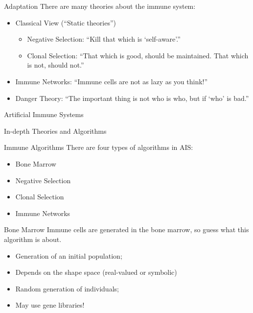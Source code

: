 \documentclass[xcolor=svgnames]{beamer}
\newcommand{\introframe}[2]{
    \begin{frame}
	   \vfill
	   \hfill\Huge{#1}
	   
	   \vspace{1em}
	   
	   \hfill\Large{#2}
	   \vfill
    \end{frame}
}
\begin{document}
		\begin{frame}{Adaptation}
		    There are many theories about the immune system:
		    
		    \begin{itemize}
		        \item Classical View (``Static theories'')
		        \begin{itemize}
    		        \item Negative Selection: ``Kill that which is `self-aware'.''
    		        \item Clonal Selection: ``That which is good, should be maintained. That which is not, should not.''
    		    \end{itemize}
    		    \pause
		        \item Immune Networks: ``Immune cells are not as lazy as you think!''
		        \pause
		        \item Danger Theory: ``The important thing is not who is who, but if `who' is bad.''
		    \end{itemize}
		\end{frame}
			
        \introframe{Artificial Immune Systems}{In-depth Theories and Algorithms}

        \begin{frame}{Immune Algorithms}
            There are four types of algorithms in AIS:

            \begin{itemize}
                \item Bone Marrow
                \item Negative Selection
                \item Clonal Selection
                \item Immune Networks
            \end{itemize}
        \end{frame}
        
        \begin{frame}{Bone Marrow}
            Immune cells are generated in the bone marrow, so guess what this algorithm is about.
            \begin{itemize}
                \item Generation of an initial population;
                \item Depends on the shape space (real-valued or symbolic)
                \item Random generation of individuals;
                \item May use gene libraries!
            \end{itemize}
        \end{frame}
        
\end{document}
